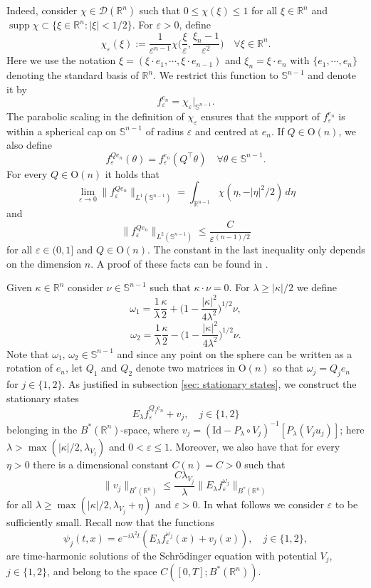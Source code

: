 \documentclass[10pt,a4paper]{amsart}
\theoremstyle{remark}
\theoremstyle{definition}
\DeclareMathOperator{\supp}{supp}
\newcommand{\R}{\mathbb{R}}
\newcommand{\Sph}{\mathbb{S}}
\newcommand{\Id}{\mathrm{Id}}
\newcommand{\om}{\omega}
\def\ve{\varepsilon}
\def\cal{\mathcal}
\begin{document}
Indeed, consider $\chi \in \cal{D}(\R^n)$ such that $0\leq \chi(\xi) \leq 1$ for all $\xi \in \R^n$ and $\supp \chi \subset \{\xi\in\R^n : |\xi| < 1/2\}$. For 
$\ve>0$, define 
%
\[
\chi_\ve(\xi) := \frac{1}{\ve^{n-1}} \chi \Big( \frac{\xi}{\ve}, \frac{\xi_n - 1}{\ve^2} \Big) \quad \forall \xi\in \R^n. 
\] 
%
Here we use the notation $\xi = (\xi \cdot e_1, \cdots, \xi \cdot e_{n-1})$ and $\xi_n = \xi \cdot e_n$ with $\{e_1, \cdots, e_n\}$ denoting the standard basis of $\R^n$. We restrict this function to $\Sph^{n-1}$ and denote it by
%
\[
f_\ve^{e_n} = \chi_\ve|_{\Sph^{n-1}} .
\]
%
The parabolic scaling in the definition of $\chi_\ve$ ensures that the support of $f_\ve^{e_n}$ is within a spherical cap on $\Sph^{n-1}$ of radius $\ve$ and centred at $e_n$. If $Q\in \mathrm{O}(n)$, we also define 
%
\[
f_\ve^{Q e_n}(\theta) = f_\ve^{e_n} (Q^\intercal \theta) \quad \forall \theta \in \Sph^{n-1}. 
\]
%
For every $Q\in \mathrm{O}(n)$ it holds that 
%
\[
\lim_{\ve \to 0} \| f_\ve^{Q e_n} \|_{L^1(\Sph^{n-1})} = \int_{\R^{n-1}} \chi(\eta, -|\eta|^2/2) \, d\eta
\]
%
and
% 
\[
\| f_\ve^{Q e_n} \|_{L^2(\Sph^{n-1})} \leq \frac{C}{ \ve^{(n-1)/2}}
\]
%
for all $\ve\in(0, 1]$ and $Q\in\mathrm{O}(n)$. The constant in the last inequality only depends on the dimension $n$. A proof of these facts can be found in \cite[Lemma 4.1]{zbMATH08122191}.

Given $\kappa \in \R^n$ consider $\nu \in \Sph^{n-1}$ such that $\kappa \cdot \nu = 0$. For $\lambda \geq |\kappa|/2$ we define 
%
\[
\om_1= \frac{1}{\lambda}\frac{\kappa}{2} + \Big( 1 - \frac{|\kappa|^2}{4\lambda^2}\Big)^{1/2} \nu, 
\]
%
\[
\om_2= \frac{1}{\lambda}\frac{\kappa}{2} - \Big( 1 - \frac{|\kappa|^2}{4\lambda^2}\Big)^{1/2} \nu.
\]
%
Note that $\om_1, \, \om_2 \in \Sph^{n-1}$ and since any point on the sphere can be written as a rotation of $e_n$, let $Q_1$ and $Q_2$ denote two matrices in $\mathrm{O}(n)$ so that $\om_j = Q_j e_n$ for $j\in \{1, 2\}$. 
As justified in subsection \ref{sec: stationary states}, we construct the stationary states 
%
\[
E_\lambda f_\ve^{Q_j e_n} + v_j , \quad j\in \{1, 2\}
\]
%
belonging in the $B^*(\R^n)$-space, where $v_j = (\Id - P_\lambda \circ V_j)^{-1}[P_\lambda(V_j u_j)]$; here $\lambda > \max (|\kappa|/2, \lambda_{V_j})$ and $0<\ve\leq 1$. 
Moreover, we also have that for every $\eta > 0$ there is a dimensional constant $C(n)=C>0$ such that 
%
\[
\|v_j\|_{B^*(\R^n)} \leq \frac{C\lambda_{V_j}}{\lambda} \|E_\lambda f^{\om_j}_\ve \|_{B^*(\R^n)}
\]
%
for all $\lambda \geq \max(|\kappa|/2, \lambda_{V_j}+ \eta)$ and $\ve>0$. In what follows we consider $\ve$ to be sufficiently small. 
Recall now that the functions 
%
\[
\psi_j(t, x)=e^{-i\lambda^2t}(E_\lambda f^{\om_j}_\ve (x) + v_j(x)), \quad j\in\{1,2\},
\]
%
are time-harmonic solutions of the Schr\"odinger equation with potential $V_j$, $j\in\{1,2\}$, and belong to the space $C([0, T]; B^*(\R^n)) $. 
\end{document}
